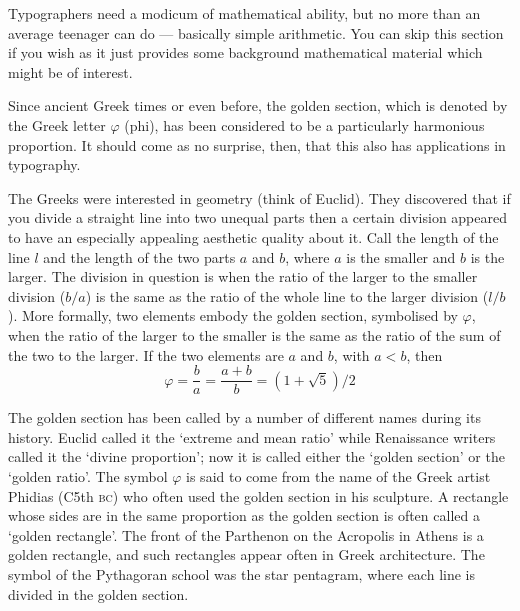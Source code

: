 \documentclass[10pt,a4paper,extrafontsizes]{memoir}
\begin{document}
\begin{paracol}{2}
\switchEng
    Typographers need a modicum of mathematical ability, but no more
than an average teenager can do --- basically simple arithmetic. You can
skip this section if you wish as it just provides some background 
mathematical material which might be of interest.

    Since ancient Greek times or even before, the golden section, which
is denoted by the Greek letter $\varphi$ (phi), has been considered to be
a particularly harmonious proportion. It should come as no surprise, then,
that this also has applications in typography.

    The Greeks were interested in geometry (think of Euclid). They discovered
that if you divide a straight line into two unequal parts then a certain
division appeared to have an especially appealing aesthetic quality about it. 
Call the length of the line $l$ and the length of the two parts $a$ and $b$, 
where $a$ is the smaller and $b$ is the larger. The division in question
is when the ratio of the larger to the smaller division ($b/a$) is the same
as the ratio of the whole line to the larger division ($l/b$).
More formally, two elements embody the golden section, symbolised by
$\varphi$, when the ratio of the larger
to the smaller is the same as the ratio of the sum of the two to the larger.
If the two elements are $a$ and $b$, with $a < b$, then
\begin{equation}
\varphi = \frac{b}{a} = \frac{a+b}{b} = (1+\sqrt{5})/2
\end{equation}

    The golden section has been called by a number of different names
during its history. Euclid
 called it the `extreme and mean ratio' while
Renaissance writers called it the `divine proportion'; now it is
called either the `golden section' or the `golden ratio'. The symbol
$\varphi$ is said to come from the name of the Greek artist 
Phidias
(C5th \textsc{bc}) who often used the golden section in his sculpture.
A rectangle whose sides are in the same proportion as the golden section
is often called a `golden rectangle'.
The front of the Parthenon on the Acropolis in Athens is a golden rectangle,
and such rectangles appear often in Greek architecture.
The symbol of the Pythagoran school was the star pentagram, 
where each line is divided in the golden section.



\end{paracol}
\end{document}
